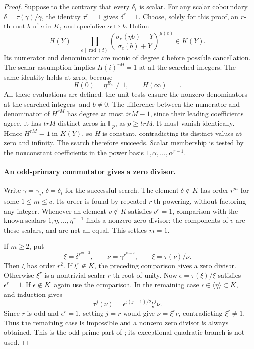 \documentclass[11pt]{article}
\theoremstyle{definition}
\theoremstyle{remark}
\begin{document}
\begin{proof}
Suppose to the contrary that every \(\delta_i\) is scalar.
For any scalar coboundary \(\delta=\tau(\gamma)/\gamma\),
the identity \(\tau^r=1\) gives \(\delta^r=1\).
Choose, solely for this proof, an \(r\)-th root \(b\) of
\(c\) in \(K\), and specialize \(\alpha\mapsto b\).
Define
\[
 H(Y)=\prod_{e\mid\operatorname{rad}(d)}
  \left(\frac{\sigma_e(\eta b)+Y}{\sigma_e(b)+Y}\right)^{\mu(e)}
                         \in K(Y).
\]
Its numerator and denominator are monic of degree \(t\)
before possible cancellation. The scalar assumption implies
\(H(i)^{rM}=1\) at all the searched integers. The same
identity holds at zero, because
\[
                   H(0)=\eta^{E_d}\ne1,
                   \qquad H(\infty)=1.
\]
All these evaluations are defined: the unit tests ensure the
nonzero denominators at the searched integers, and \(b\ne0\).
The difference between the numerator and denominator of
\(H^{rM}\) has degree at most \(trM-1\), since their leading
coefficients agree. It has \(trM\) distinct zeros in
\(\mathbb F_p\), as \(p\geq trM\). It must vanish
identically. Hence \(H^{rM}=1\) in \(K(Y)\), so \(H\)
is constant, contradicting its distinct values at zero and
infinity. The search therefore succeeds. Scalar membership
is tested by the nonconstant coefficients in the power basis
\(1,\alpha,\ldots,\alpha^{r-1}\).

\paragraph{An odd-primary commutator gives a zero divisor.}
Write \(\gamma=\gamma_i\), \(\delta=\delta_i\) for the
successful search. The element \(\delta\notin K\) has order
\(r^m\) for some \(1\leq m\leq a\). Its order is found
by repeated \(r\)-th powering, without factoring any integer.
Whenever an element \(v\notin K\) satisfies \(v^r=1\),
comparison with the known scalars
\(1,\eta,\ldots,\eta^{r-1}\) finds a nonzero zero divisor:
the components of \(v\) are these scalars, and are not all
equal. This settles \(m=1\).

If \(m\geq2\), put
\[
 \xi=\delta^{r^{m-2}},\qquad
 \nu=\gamma^{r^{m-2}},\qquad
 \xi=\tau(\nu)/\nu.
\]
Then \(\xi\) has order \(r^2\). If \(\xi^r\notin K\),
the preceding comparison gives a zero divisor. Otherwise
\(\xi^r\) is a nontrivial scalar \(r\)-th root of unity.
Now \(\epsilon=\tau(\xi)/\xi\) satisfies \(\epsilon^r=1\).
If \(\epsilon\notin K\), again use the comparison. In the
remaining case \(\epsilon\in\langle\eta\rangle\subset K\),
and induction gives
\[
       \tau^j(\nu)=\epsilon^{j(j-1)/2}\xi^j\nu.
\]
Since \(r\) is odd and \(\epsilon^r=1\), setting \(j=r\)
would give \(\nu=\xi^r\nu\), contradicting \(\xi^r\ne1\).
Thus the remaining case is impossible and a nonzero zero
divisor is always obtained. This is the odd-prime part of
\citet[Section~5.10, author p.~20]{BGL2001}; its exceptional
quadratic branch is not used.


\end{proof}
\end{document}

